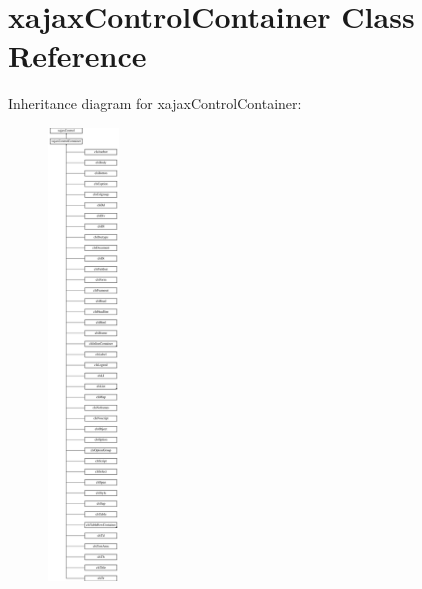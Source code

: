 \hypertarget{classxajaxControlContainer}{
\section{xajaxControlContainer Class Reference}
\label{classxajaxControlContainer}
}
Inheritance diagram for xajaxControlContainer:\begin{figure}[H]
\begin{center}
\leavevmode
\includegraphics[height=12.000000cm]{classxajaxControlContainer}
\end{center}
\end{figure}
